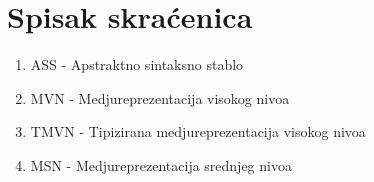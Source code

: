 \section{Spisak skraćenica}

\begin{enumerate}
    \item ASS - Apstraktno sintaksno stablo 
    \item MVN - Medjureprezentacija visokog nivoa
    \item TMVN - Tipizirana medjureprezentacija visokog nivoa
    \item MSN - Medjureprezentacija srednjeg nivoa
\end{enumerate}